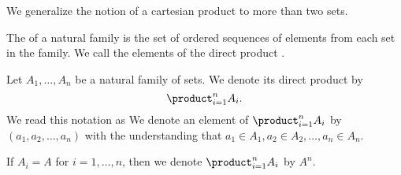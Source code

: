 
\sbasic















\sstart
{}


We generalize the notion
of a cartesian product to
more than two sets.


The 
of a natural family is
the set of ordered sequences
of elements from each set in the family.
We call the elements of the direct product
.


Let $A_1, \dots, A_n$ be a natural family
of sets. We denote its direct product by
\[
  \product_{i = 1}^{n} A_{i}.
\]
We read this notation as 
We denote an element of $\product_{i = 1}^{n} A_{i}$ by $(a_1, a_2, \dots, a_n)$ with the understanding that $a_1 \in A_1, a_2 \in A_2, \dots, a_n \in A_n$.

If $A_i = A$ for $i = 1, \dots, n$, then we denote
$\product_{i = 1}^{n} A_{i}$ by $A^n$.


\strats
\strats
